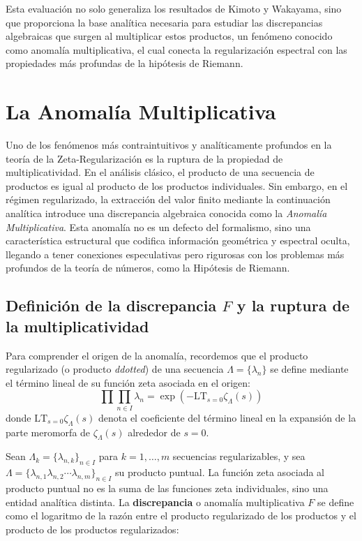 Esta evaluación no solo generaliza los resultados de Kimoto y Wakayama, sino que proporciona la base analítica necesaria para estudiar las discrepancias algebraicas que surgen al multiplicar estos productos, un fenómeno conocido como anomalía multiplicativa, el cual conecta la regularización espectral con las propiedades más profundas de la hipótesis de Riemann.

\section{La Anomalía Multiplicativa}

Uno de los fenómenos más contraintuitivos y analíticamente profundos en la teoría de la Zeta-Regularización es la ruptura de la propiedad de multiplicatividad. En el análisis clásico, el producto de una secuencia de productos es igual al producto de los productos individuales. Sin embargo, en el régimen regularizado, la extracción del valor finito mediante la continuación analítica introduce una discrepancia algebraica conocida como la \textit{Anomalía Multiplicativa}. Esta anomalía no es un defecto del formalismo, sino una característica estructural que codifica información geométrica y espectral oculta, llegando a tener conexiones especulativas pero rigurosas con los problemas más profundos de la teoría de números, como la Hipótesis de Riemann.

\subsection{Definición de la discrepancia $F$ y la ruptura de la multiplicatividad}

Para comprender el origen de la anomalía, recordemos que el producto regularizado (o producto \textit{ddotted}) de una secuencia $\Lambda = \{\lambda_n\}$ se define mediante el término lineal de su función zeta asociada en el origen:
$$ \prod\prod_{n \in I} \lambda_n = \exp\left( -\text{LT}_{s=0} \zeta_\Lambda(s) \right) $$
donde $\text{LT}_{s=0} \zeta_\Lambda(s)$ denota el coeficiente del término lineal en la expansión de la parte meromorfa de $\zeta_\Lambda(s)$ alrededor de $s=0$.

Sean $\Lambda_k = \{\lambda_{n,k}\}_{n \in I}$ para $k=1, \dots, m$ secuencias regularizables, y sea $\Lambda = \{\lambda_{n,1}\lambda_{n,2} \cdots \lambda_{n,m}\}_{n \in I}$ su producto puntual. La función zeta asociada al producto puntual no es la suma de las funciones zeta individuales, sino una entidad analítica distinta. La \textbf{discrepancia} o anomalía multiplicativa $F$ se define como el logaritmo de la razón entre el producto regularizado de los productos y el producto de los productos regularizados:

